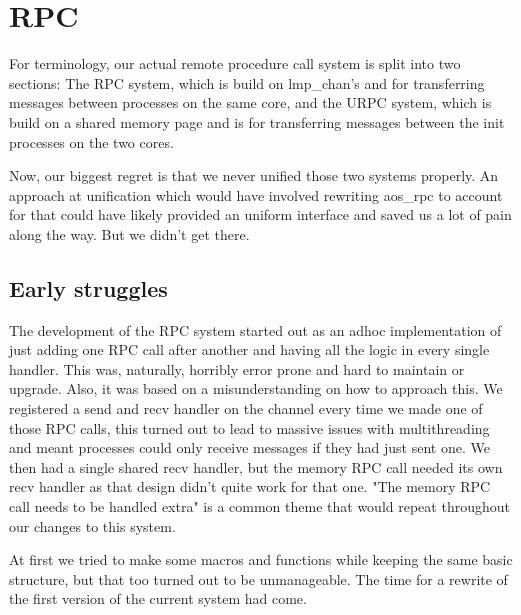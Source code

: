 \section{RPC}\label{s:RPC}

For terminology, our actual remote procedure call system is split into two 
sections:
The RPC system, which is build on lmp\_chan's and for transferring messages 
between processes on the same core, and the URPC system, which is build on a 
shared memory page and is for transferring messages between the init processes 
on the two cores.
\medskip

Now, our biggest regret is that we never unified those two systems properly. 
An approach at unification which would have involved rewriting aos\_rpc to 
account for that could have likely provided an uniform interface and saved us 
a lot of pain along the way. But we didn't get there.

\subsection{Early struggles}
The development of the RPC system started out as an adhoc implementation of 
just adding one RPC call after another and having all the logic in every single
handler. This was, naturally, horribly error prone and hard to maintain or upgrade. 
Also, it was based on a misunderstanding on how to approach this. We 
registered a send and recv handler on the channel every time we made one of 
those RPC calls, this turned out to lead to massive issues with multithreading 
and meant processes could only receive messages if they had just sent one. 
We then had 
a single shared recv handler, but the memory RPC call needed its own recv 
handler as that design didn't quite work for that one. "The memory RPC call 
needs to be handled extra" is a common theme that would repeat throughout our 
changes to this system.
\medskip

At first we tried to make some macros and functions while keeping the same 
basic structure, but that too turned out to be unmanageable. The time for a 
rewrite of the first version of the current system had come. 

